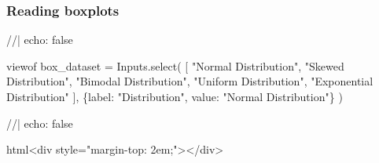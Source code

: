 \documentclass[
  letterpaper,
  DIV=11,
  numbers=noendperiod]{scrartcl}
\newenvironment{Shaded}{\begin{snugshade}}{\end{snugshade}}
\newcommand{\NormalTok}[1]{\textcolor[rgb]{0.00,0.23,0.31}{#1}}
\begin{document}
\subsubsection{Reading boxplots}\label{reading-boxplots}

\hfill\break

\begin{Shaded}
\begin{Highlighting}[]
\NormalTok{//| echo: false}

\NormalTok{viewof box\_dataset = Inputs.select(}
\NormalTok{  [}
\NormalTok{    "Normal Distribution", "Skewed Distribution", "Bimodal Distribution",}
\NormalTok{    "Uniform Distribution", "Exponential Distribution"}
\NormalTok{  ],}
\NormalTok{  \{label: "Distribution", value: "Normal Distribution"\}}
\NormalTok{)}
\end{Highlighting}
\end{Shaded}

\begin{Shaded}
\begin{Highlighting}[]
\NormalTok{//| echo: false}

\NormalTok{html\textasciigrave{}\textless{}div style="margin{-}top: 2em;"\textgreater{}\textless{}/div\textgreater{}\textasciigrave{}}
\end{Highlighting}
\end{Shaded}
\end{document}
